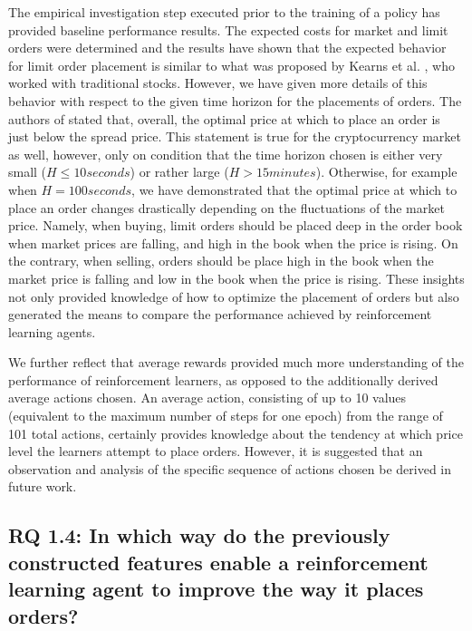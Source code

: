    The empirical investigation step executed prior to the training of a policy has provided baseline performance results.
    The expected costs for market and limit orders were determined and the results have shown that the expected behavior for limit order placement is similar to what was proposed by Kearns et al. \cite{nevmyvaka2005electronic}, who worked with traditional stocks.
    However, we have given more details of this behavior with respect to the given time horizon for the placements of orders.
    The authors of \cite{nevmyvaka2005electronic} stated that, overall, the optimal price at which to place an order is just below the spread price.
    This statement is true for the cryptocurrency market as well, however, only on condition that the time horizon chosen is either very small ($H\leq10 seconds$) or rather large ($H>15 minutes$).
    Otherwise, for example when $H=100 seconds$, we have demonstrated that the optimal price at which to place an order changes drastically depending on the fluctuations of the market price.
    Namely, when buying, limit orders should be placed deep in the order book when market prices are falling, and high in the book when the price is rising.
    On the contrary, when selling, orders should be place high in the book when the market price is falling and low in the book when the price is rising.
    These insights not only provided knowledge of how to optimize the placement of orders but also generated the means to compare the performance achieved by reinforcement learning agents.
    
    We further reflect that average rewards provided much more understanding of the performance of reinforcement learners, as opposed to the additionally derived average actions chosen.
    An average action, consisting of up to 10 values (equivalent to the maximum number of steps for one epoch) from the range of 101 total actions, certainly provides knowledge about the tendency at which price level the learners attempt to place orders.
    However, it is suggested that an observation and analysis of the specific sequence of actions chosen be derived in future work.
    
\subsection{RQ 1.4: In which way do the previously constructed features enable a reinforcement learning agent to improve the way it places orders?}

